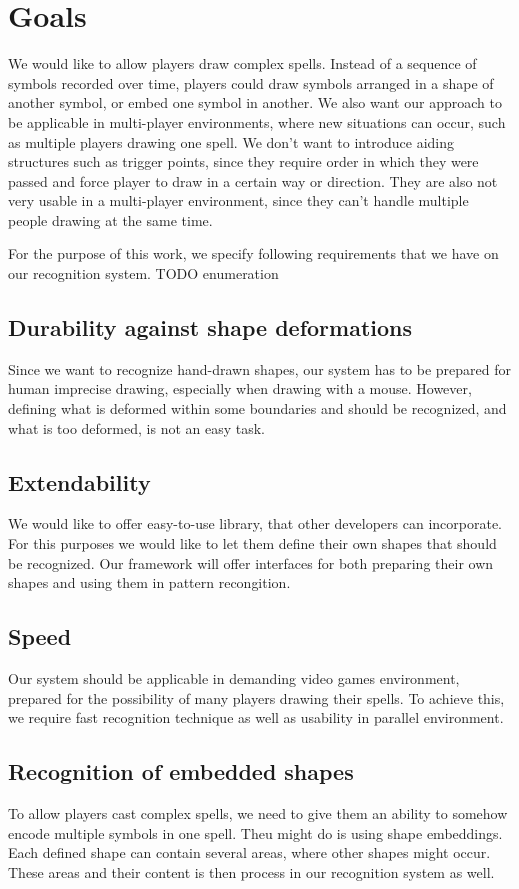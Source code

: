 \section{Goals}

We would like to allow players draw complex spells. Instead of a sequence of symbols recorded over time, players could draw symbols arranged in a shape of another symbol, or embed one symbol in another. We also want our approach to be applicable in multi-player environments, where new situations can occur, such as multiple players drawing one spell. We don't want to introduce aiding structures such as trigger points, since they require order in which they were passed and force player to draw in a certain way or direction. They are also not very usable in a multi-player environment, since they can't handle multiple people drawing at the same time.

For the purpose of this work, we specify following requirements that we have on our recognition system.
TODO enumeration 

\subsection{Durability against shape deformations}
Since we want to recognize hand-drawn shapes, our system has to be prepared for human imprecise drawing, especially when drawing with a mouse. However, defining what is deformed within some boundaries and should be recognized, and what is too deformed, is not an easy task.

\subsection{Extendability}
We would like to offer easy-to-use library, that other developers can incorporate. For this purposes we would like to let them define their own shapes that should be recognized. Our framework will offer interfaces for both preparing their own shapes and using them in pattern recongition.

\subsection{Speed}
Our system should be applicable in demanding video games environment, prepared for the possibility of many players drawing their spells. To achieve this, we require fast recognition technique as well as usability in parallel environment. 

\subsection{Recognition of embedded shapes}
To allow players cast complex spells, we need to give them an ability to somehow encode multiple symbols in one spell. Theu might do is using shape embeddings. Each defined shape can contain several areas, where other shapes might occur. These areas and their content is then process in our recognition system as well.

